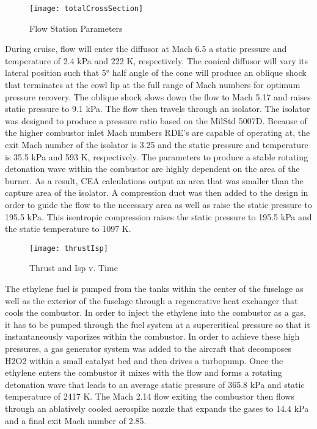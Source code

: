 \begin{figure}[H]
\begin{center}
\texttt{[image: totalCrossSection]}
\caption{Flow Station Parameters}
\label{fig:totalCrossSection}
\end{center}
\end{figure}

During cruise, flow will enter the diffusor at Mach 6.5 a static pressure and temperature of 2.4 kPa and 222 K, respectively. The conical diffusor will vary its lateral position such that \ang{5} half angle of the cone will produce an oblique shock that terminates at the cowl lip at the full range of Mach numbers for optimum pressure recovery. The oblique shock slows down the flow to Mach 5.17 and raises static pressure to 9.1 kPa. The flow then travels through an isolator. The isolator was designed to produce a pressure ratio based on the MilStd 5007D. Because of the higher combustor inlet Mach numbers RDE’s are capable of operating at, the exit Mach number of the isolator is 3.25 and the static pressure and temperature is 35.5 kPa and 593 K, respectively. The parameters to produce a stable rotating detonation wave within the combustor are highly dependent on the area of the burner. As a result, CEA calculations output an area that was smaller than the capture area of the isolator. A compression duct was then added to the design in order to guide the flow to the necessary area as well as raise the static pressure to 195.5 kPa. This isentropic compression raises the static pressure to 195.5 kPa and the static temperature to 1097 K.

\begin{wrapfigure}{r}{0.5\textwidth}
\begin{center}
\texttt{[image: thrustIsp]}
\caption{Thrust and Isp v. Time}
\label{fig:thrustIsp}
\end{center}
\end{wrapfigure}

        	The ethylene fuel is pumped from the tanks within the center of the fuselage as well as the exterior of the fuselage through a regenerative heat exchanger that cools the combustor. In order to inject the ethylene into the combustor as a gas, it has to be pumped through the fuel system at a supercritical pressure so that it instantaneously vaporizes within the combustor. In order to achieve these high pressures, a gas generator system was added to the aircraft that decomposes H2O2 within a small catalyst bed and then drives a turbopump. Once the ethylene enters the combustor it mixes with the flow and forms a rotating detonation wave that leads to an average static pressure of 365.8 kPa and static temperature of 2417 K. The Mach 2.14 flow exiting the combustor then flows through an ablatively cooled aerospike nozzle that expands the gases to 14.4 kPa and a final exit Mach number of 2.85.







